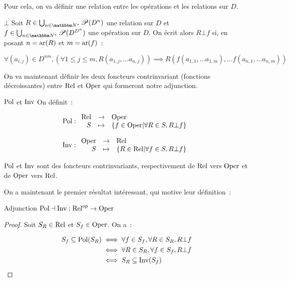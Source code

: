 Pour cela, on va définir une relation entre les opérations et les relations sur $D$.

\begin{defi}{$\bot$} Soit $R\in \bigcup_{n\in\N^*} \P(D^n)$ une relation sur $D$
    et $f\in\bigcup_{n\in\N^*} \P(D^{D^n})$ une opération sur $D$. On écrit alors
    $R\bot f$ si, en posant $n = \text{ar}(R)$ et $m = \text{ar}(f)$~:

    \[ \forall (a_{i,j})\in D^{nm}, (\forall 1\leq j\leq m, R(a_{1,j}, \dots a_{n, j}))
         \implies R(f(a_{1,1}, \dots a_{1,m}), \dots f(a_{n,1}, \dots a_{n,m})) \]
\end{defi}

On va maintenant définir les deux foncteurs contrinvariant (fonctions décroissantes)
entre $\text{Rel}$ et $\text{Oper}$ qui formeront notre adjunction.

\begin{defi}{$\text{Pol}$ et $\text{Inv}$}
    On définit~:

    \[\text{Pol}:\begin{array}{rcl}\text{Rel} & \rightarrow & \text{Oper} \\
        S & \mapsto & \{f\in\text{Oper} | \forall R\in S, R\bot f\} \\
    \end{array}\]

    \[\text{Inv}:\begin{array}{rcl}\text{Oper} & \rightarrow & \text{Rel} \\
        S & \mapsto & \{R\in\text{Rel} | \forall f\in S, R\bot f\} \\
    \end{array}\]
\end{defi}

\begin{lem}
    $\text{Pol}$ et $\text{Inv}$ sont des foncteurs contrinvariants, respectivement de $\text{Rel}$ vers
    $\text{Oper}$ et de $\text{Oper}$ vers $\text{Rel}$.
\end{lem}

On a maintenant le premier résultat intéressant, qui motive leur définition~:

\begin{theo}{Adjunction}
    $\text{Pol}\dashv\text{Inv} : \text{Rel}^\text{op} \rightarrow \text{Oper}$
\end{theo}
\begin{proof}
    Soit $S_R\in\text{Rel}$ et $S_f\in\text{Oper}$. On a~:

    \begin{align*}
        S_f\subseteq\text{Pol}(S_R) &\iff \forall f\in S_f, \forall R\in S_R, R\bot f \\
                              &\iff \forall R\in S_R, \forall f\in S_f, R\bot f \\
                              &\iff S_R\subseteq\text{Inv}(S_f)
    \end{align*}
\end{proof}

